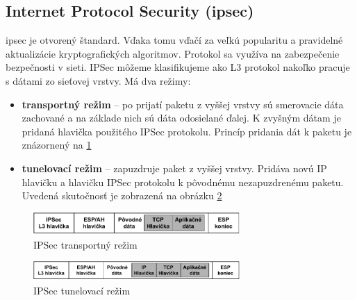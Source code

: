 \subsection{Internet Protocol Security (\acrshort{ipsec})}
\acrshort{ipsec} je otvorený štandard. Vďaka tomu vďačí za veľkú popularitu a pravidelné aktualizácie kryptografických algoritmov. Protokol sa využíva na zabezpečenie bezpečnosti v sieti. IPSec môžeme klasifikujeme ako L3 protokol nakoľko pracuje s dátami zo sieťovej vrstvy. Má dva režimy:
\begin{itemize}
	\item{\textbf{transportný režim}} -- po prijatí paketu z vyššej vrstvy sú smerovacie dáta zachované a na základe nich sú dáta odosielané ďalej. K zvyšným dátam je pridaná hlavička použitého IPSec protokolu. Princíp pridania dát k paketu je znázornený na \ref{iptransport}  
	\item{\textbf{tunelovací režim}} -- zapuzdruje paket z vyššej vrstvy. Pridáva novú IP hlavičku a hlavičku IPSec protokolu k pôvodnému nezapuzdrenému paketu. Uvedená skutočnosť je zobrazená na obrázku \ref{iptunel}
\end{itemize}
\begin{figure} [!h]
	\centering
	\includegraphics[width=0.7\textwidth]{figures/iptransport}
	\caption{IPSec transportný režim}
	\label{iptransport}
\end{figure}
\begin{figure} [!h]
	\centering
	\includegraphics[width=0.7\textwidth]{figures/iptunel}
	\caption{IPSec tunelovací režim}
	\label{iptunel}
\end{figure}


